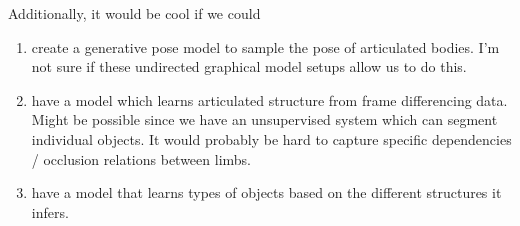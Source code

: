 \documentclass{article}
\begin{document}
Additionally, it would be cool if we could
\begin{enumerate}
\item create a generative pose model to sample the pose of articulated bodies. I'm not sure if these undirected graphical model setups allow us to do this.
\item have a model which learns articulated structure from frame differencing data. Might be possible since we have an unsupervised system which can segment individual objects. It would probably be hard to capture specific dependencies / occlusion relations between limbs.
\item have a model that learns types of objects based on the different structures it infers.
\end{enumerate}



\begin{small}

 
\end{small}
\end{document}
